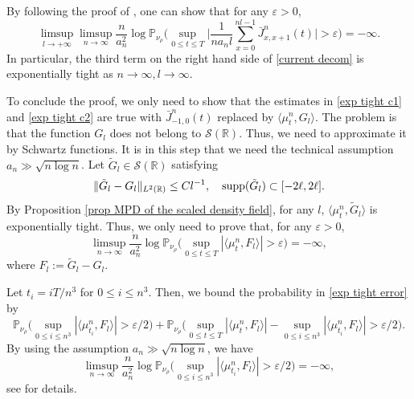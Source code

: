 \documentclass[reqno,11pt]{amsart}
\numberwithin{equation}{section}
\newcommand{\Pbb}{\mathbb{P}}
\newcommand{\R}{\mathbb{R}}
\begin{document}
By following the proof of \cite[Lemma 5.1]{xue2024sample}, one can show that for any $\varepsilon > 0$,
\begin{equation}\label{super exp 1}
\limsup_{l\rightarrow+\infty} \limsup_{n \rightarrow \infty} \frac{n}{a_n^2} \log \Pbb_{\nu_\rho} \Big( \sup_{0 \leq t \leq T} \Big| \frac{1}{na_n l} \sum_{x=0}^{nl-1} \bar{J}^n_{x,x+1} (t) \Big| > \varepsilon \Big) = - \infty.
\end{equation}
In particular, the third term on the right hand side of \eqref{current decom} is exponentially tight as $n \rightarrow \infty, l \rightarrow \infty$.

To conclude the proof, we only need to show that the estimates in \eqref{exp tight c1} and \eqref{exp tight c2} are true with $\bar{J}^n_{-1,0} (t)$ replaced by $\langle \mu^n_t,G_l\rangle$. The problem is that the function $G_l$ does not belong to $\mathcal{S} (\R)$.  Thus, we need to approximate it by Schwartz functions. It is in this step that we need the technical assumption $a_n \gg \sqrt{n \log n}$. Let $\tilde{G}_l \in  \mathcal{S} (\R)$ satisfying
\[\|\tilde{G}_l  - G_l\|_{L^2(\R)} \leq Cl^{-1}, \quad {\rm supp} (\tilde{G}_l) \subset [-2\ell,2\ell].\]
By Proposition \ref{prop MPD of the scaled density field}, for any $l$, $\langle \mu^n_t,\tilde{G}_l\rangle$ is exponentially tight. Thus, we only need to  prove that,  for any $\varepsilon > 0$, 
 \begin{equation}\label{exp tight error}
\limsup_{n \rightarrow \infty} \frac{n}{a_n^2} \log \Pbb_{\nu_\rho} \Big( \sup_{0 \leq t \leq T} |\langle \mu^n_t,F_l\rangle | >  \varepsilon \Big) = -\infty,
\end{equation}
where  $F_l := \tilde{G}_l - G_l$. 

Let $t_i = i T / n^3$ for $0 \leq i \leq n^3$. Then, we bound the probability in \eqref{exp tight error} by 
\[\Pbb_{\nu_\rho} \Big( \sup_{0 \leq i \leq n^3} |\langle \mu^n_{t_i},F_l\rangle | >  \varepsilon/2 \Big) + \Pbb_{\nu_\rho} \Big( \sup_{0 \leq t \leq T} |\langle \mu^n_t,F_l\rangle | - \sup_{0 \leq i \leq n^3} |\langle \mu^n_{t_i},F_l\rangle |  >  \varepsilon/2 \Big).\]
By using the assumption $a_n \gg \sqrt{n \log n}$, we have
\[\limsup_{n \rightarrow \infty} \frac{n}{a_n^2} \log \Pbb_{\nu_\rho} \Big( \sup_{0 \leq i \leq n^3} |\langle \mu^n_{t_i},F_l\rangle | >  \varepsilon/2 \Big)  = - \infty,\]
see \cite[Proof of the first term in (5.16)]{xue2024sample} for details.  
\end{document}
